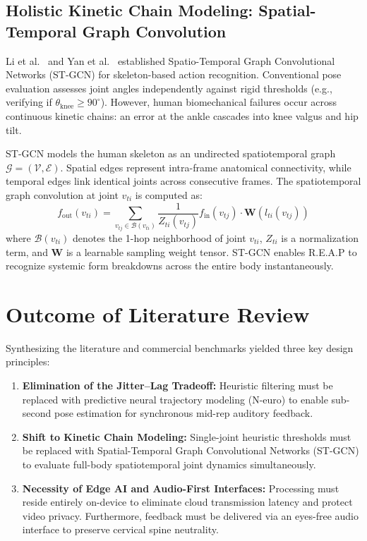 \documentclass[12pt,a4paper]{report}
\begin{document}
\subsection{Holistic Kinetic Chain Modeling: Spatial-Temporal Graph Convolution}
Li et al.~\cite{li2018stgcn} and Yan et al.~\cite{yan2018spatial} established Spatio-Temporal Graph Convolutional Networks (ST-GCN) for skeleton-based action recognition. Conventional pose evaluation assesses joint angles independently against rigid thresholds (e.g., verifying if $\theta_{\text{knee}} \ge 90^\circ$). However, human biomechanical failures occur across continuous kinetic chains: an error at the ankle cascades into knee valgus and hip tilt.

ST-GCN models the human skeleton as an undirected spatiotemporal graph $\mathcal{G} = (\mathcal{V}, \mathcal{E})$. Spatial edges represent intra-frame anatomical connectivity, while temporal edges link identical joints across consecutive frames. The spatiotemporal graph convolution at joint $v_{ti}$ is computed as:
\begin{equation}
    f_{\text{out}}(v_{ti}) = \sum_{v_{tj} \in \mathcal{B}(v_{ti})} \frac{1}{Z_{ti}(v_{tj})} f_{\text{in}}(v_{tj}) \cdot \mathbf{W}\left(l_{ti}(v_{tj})\right)
    \label{eq:stgcn}
\end{equation}
where $\mathcal{B}(v_{ti})$ denotes the 1-hop neighborhood of joint $v_{ti}$, $Z_{ti}$ is a normalization term, and $\mathbf{W}$ is a learnable sampling weight tensor. ST-GCN enables R.E.A.P to recognize systemic form breakdowns across the entire body instantaneously.

\section{Outcome of Literature Review}
Synthesizing the literature and commercial benchmarks yielded three key design principles:
\begin{enumerate}[label=\textbf{\arabic*.}]
    \item \textbf{Elimination of the Jitter--Lag Tradeoff:} Heuristic filtering must be replaced with predictive neural trajectory modeling (N-euro) to enable sub-second pose estimation for synchronous mid-rep auditory feedback.
    \item \textbf{Shift to Kinetic Chain Modeling:} Single-joint heuristic thresholds must be replaced with Spatial-Temporal Graph Convolutional Networks (ST-GCN) to evaluate full-body spatiotemporal joint dynamics simultaneously.
    \item \textbf{Necessity of Edge AI and Audio-First Interfaces:} Processing must reside entirely on-device to eliminate cloud transmission latency and protect video privacy. Furthermore, feedback must be delivered via an eyes-free audio interface to preserve cervical spine neutrality.
\end{enumerate}
\end{document}
